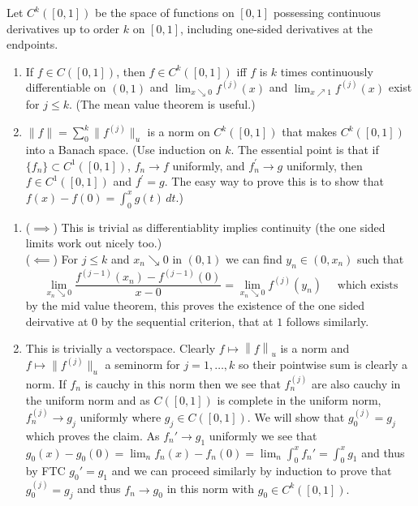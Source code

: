 \documentclass[12pt,a4paper]{article}
\begin{document}
\begin{problem}\label{prob:5-9}
Let $C^k([0,1])$ be the space of functions on $[0,1]$ possessing continuous derivatives up to order $k$ on $[0,1]$, including one-sided derivatives at the endpoints.
\begin{enumerate}[label=\alph*.]
\item If $f \in C([0,1])$, then $f \in C^k([0,1])$ iff $f$ is $k$ times continuously differentiable on $(0,1)$ and $\lim_{x \searrow 0} f^{(j)}(x)$ and $\lim_{x \nearrow 1} f^{(j)}(x)$ exist for $j \le k$. (The mean value theorem is useful.)
\item $\|f\| = \sum_{0}^{k} \|f^{(j)}\|_u$ is a norm on $C^k([0,1])$ that makes $C^k([0,1])$ into a Banach space. (Use induction on $k$. The essential point is that if $\{f_n\} \subset C^1([0,1])$, $f_n \rightarrow f$ uniformly, and $f_n^\prime \rightarrow g$ uniformly, then $f \in C^1([0,1])$ and $f^\prime = g$. The easy way to prove this is to show that $f(x) - f(0) = \int_0^x g(t)\,dt$.)
\end{enumerate}
\end{problem}
\begin{solution}
    \begin{enumerate}[label=\alph*.]
        \item ($\implies$) This is trivial as differentiablity implies continuity (the one sided limits work out nicely too.) 
            \\ ($\impliedby$) For $j\leq k$ and $x_n\searrow 0$ in $(0,1)$ we can find $y_n\in(0,x_n)$ such that 
            \[
                \lim_{x_n\searrow 0} \frac{f^{(j-1)}(x_n)-f^{(j-1)}(0)}{x-0}=\lim_{x_n\searrow 0} f^{(j)}(y_n)\quad\text{ which exists}
            \]
            by the mid value theorem, this proves the existence of the one sided deirvative at $0$ by the sequential criterion, that at $1$ follows similarly. 
        \item This is trivially a vectorspace. 
            Clearly $f\mapsto \left\|f\right\|_u$ is a norm and $f\mapsto\|f^{(j)}\|_u$ a seminorm for $j=1,\ldots,k$ so their pointwise sum is clearly a norm. 
            If $f_n$ is cauchy in this norm then we see that $f_n^{(j)}$ are also cauchy in the uniform norm and as $C([0,1])$ is complete in the uniform norm, $f_n^{(j)}\to g_j$ uniformly where $g_j\in C([0,1]).$ 
            We will show that $g_0^{(j)}=g_j$ which proves the claim. 
            As $f_n'\to g_1$ uniformly we see that $g_0(x)-g_0(0)=\lim_n f_n(x)-f_n(0)=\lim_n\int_0^xf_n'=\int_0^xg_1$ and thus by FTC $g_0'=g_1$ and we can proceed similarly by induction to prove that $g_0^{(j)}=g_j$ and thus $f_n\to g_0$ in this norm with $g_0\in C^k([0,1]).$ 
    \end{enumerate}
\end{solution}
\end{document}
